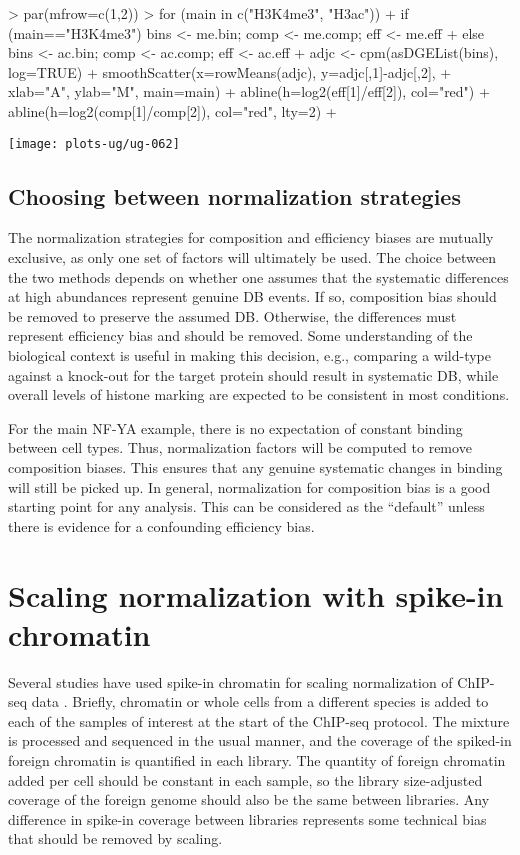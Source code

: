 \documentclass[12pt]{report}
\renewenvironment{Schunk}{\vspace{0pt}}{\vspace{0pt}}
\begin{document}
\begin{Schunk}
\begin{Sinput}
> par(mfrow=c(1,2))
> for (main in c("H3K4me3", "H3ac")) { 
+     if (main=="H3K4me3") { bins <- me.bin; comp <- me.comp; eff <- me.eff }
+     else { bins <- ac.bin; comp <- ac.comp; eff <- ac.eff }
+     adjc <- cpm(asDGEList(bins), log=TRUE)
+     smoothScatter(x=rowMeans(adjc), y=adjc[,1]-adjc[,2], 
+         xlab="A", ylab="M", main=main)
+     abline(h=log2(eff[1]/eff[2]), col="red")
+     abline(h=log2(comp[1]/comp[2]), col="red", lty=2)
+ }
\end{Sinput}
\end{Schunk}

\begin{center}
\texttt{[image: plots-ug/ug-062]}
\end{center}

\subsection{Choosing between normalization strategies}
The normalization strategies for composition and efficiency biases are mutually exclusive, as only one set of factors will ultimately be used.
The choice between the two methods depends on whether one assumes that the systematic differences at high abundances represent genuine DB events.
If so, composition bias should be removed to preserve the assumed DB.
Otherwise, the differences must represent efficiency bias and should be removed.
Some understanding of the biological context is useful in making this decision, e.g., comparing a wild-type against a knock-out for the target protein should result in systematic DB, while overall levels of histone marking are expected to be consistent in most conditions.

For the main NF-YA example, there is no expectation of constant binding between cell types.
Thus, normalization factors will be computed to remove composition biases.
This ensures that any genuine systematic changes in binding will still be picked up.
In general, normalization for composition bias is a good starting point for any analysis.
This can be considered as the ``default'' unless there is evidence for a confounding efficiency bias.

\section{Scaling normalization with spike-in chromatin}
Several studies have used spike-in chromatin for scaling normalization of ChIP-seq data \citep{bonhoure2014quantifying,orlando2014quantitative}.
Briefly, chromatin or whole cells from a different species is added to each of the samples of interest at the start of the ChIP-seq protocol.
The mixture is processed and sequenced in the usual manner, and the coverage of the spiked-in foreign chromatin is quantified in each library.
The quantity of foreign chromatin added per cell should be constant in each sample, so the library size-adjusted coverage of the foreign genome should also be the same between libraries.
Any difference in spike-in coverage between libraries represents some technical bias that should be removed by scaling.
\end{document}
